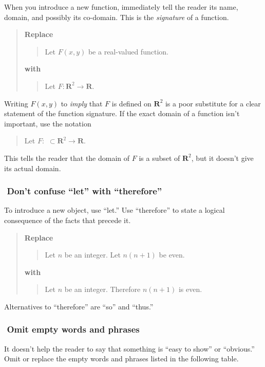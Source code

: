 \documentclass[12pt]{article}
\newcounter{ex}\setcounter{ex}{0}
\newcommand{\ex}{%
\hspace{-0.2in} \setcounter{ex}{\value{ex}+1}
\theex \,\,}
\newcounter{se}\setcounter{se}{0}
\begin{document}
When you introduce a new function, immediately tell the reader its 
name, domain, and possibly its co-domain. This is the \emph{signature}
of a function.
\begin{quote}
\textbf{\textbf{Replace}}
\begin{quote}
Let \(F(x,y)\) be a real-valued function.
\end{quote}
\textbf{with}
\begin{quote}
Let \(F : \mathbf{R}^2 \to \mathbf{R}\).
\end{quote}
\end{quote}
Writing \(F(x,y)\) to \emph{imply} that \(F\) is defined
on \( \mathbf{R}^2\) is a poor substitute for a clear statement of 
the function signature. If the exact domain of a function isn't 
important, use the notation
\begin{quote}
Let \(F :\,\, \subset \mathbf{R}^2 \to \mathbf{R}\).
\end{quote}
This tells the reader that the domain of \(F\) is a subset
of \(\mathbf{R}^2\), but it doesn't give its actual domain.


\subsubsection*{\ex Don't confuse ``let'' with ``therefore''}

To introduce a new object, use ``let.''  Use ``therefore'' to
state a logical consequence of the facts that precede it.


\begin{quote}
\textbf{\textbf{Replace}}
\begin{quote}
  Let \(n\) be an integer. Let \(n (n+1)\) be even.
\end{quote}
\textbf{with}
\begin{quote}
Let \(n\) be an integer.  Therefore \(n (n+1)\) is even.
\end{quote}
\end{quote}
Alternatives to ``therefore'' are ``so'' and ``thus.''


\subsubsection*{\ex  Omit empty words and phrases} 

It doesn't help the reader to say that something is 
``easy to show'' or ``obvious.'' Omit or replace
the empty words and phrases listed in the following table.
\end{document}
